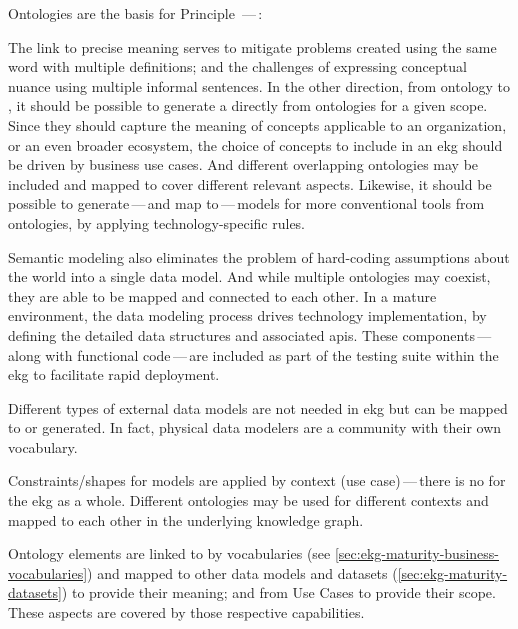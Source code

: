 %
%
Ontologies are the basis for Principle \,---\,:


The link to precise meaning serves to mitigate problems created using the same word with multiple definitions;
and the challenges of expressing conceptual nuance using multiple informal sentences.
In the other direction, from ontology to , it should be possible to generate a
 directly from ontologies for a given scope.
Since they should capture the meaning of concepts applicable to an organization, or an even broader ecosystem,
the choice of concepts to include in an \gls{ekg} should be driven by business use cases.
And different overlapping ontologies may be included and mapped to cover different relevant aspects.
Likewise, it should be possible to generate\,---\,and map to\,---\,models for more conventional tools from ontologies,
by applying technology-specific rules.

Semantic modeling also eliminates the problem of hard-coding assumptions about the world into a single data model.
And while multiple ontologies may coexist, they are able to be mapped and connected to each other.
In a mature environment, the data modeling process drives technology implementation,
by defining the detailed data structures and associated \glspl{api}.
These components\,---\,along with functional code\,---\,are included as part of the testing suite
within the \gls{ekg} to facilitate rapid deployment.

Different types of external data models are not needed in \gls{ekg} but can be mapped to or generated.
In fact, physical data modelers are a community with their own vocabulary.

Constraints/shapes for models are applied by context (use case)\,---\,there is no 
for the \gls{ekg} as a whole.
Different ontologies may be used for different contexts and mapped to each other in the underlying knowledge graph.

Ontology elements are linked to by vocabularies (see \ref{sec:ekg-maturity-business-vocabularies}) and mapped to other
data models and datasets (\ref{sec:ekg-maturity-datasets}) to provide their meaning;
and from Use Cases to provide their scope.
These aspects are covered by those respective capabilities.
